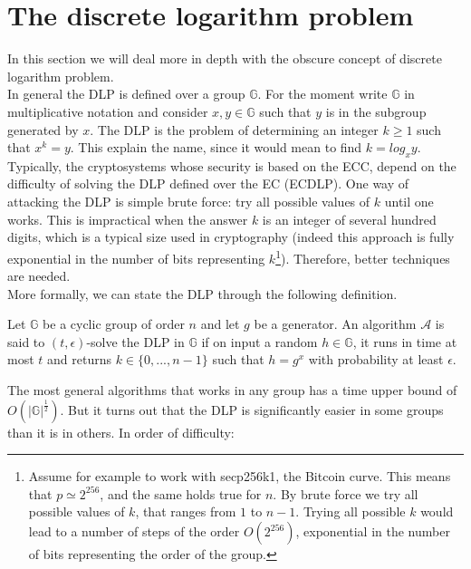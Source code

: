 \bigskip

\bigskip

\section{The discrete logarithm problem}
\label{dlp}
In this section we will deal more in depth with the obscure concept of discrete logarithm problem.
\\
In general the DLP is defined over a group $\mathbb{G}$. For the moment write $\mathbb{G}$ in multiplicative notation and consider $x, y \in \mathbb{G}$ such that $y$ is in the subgroup generated by $x$. The DLP is the problem of determining an integer $k \geq 1$ such that $x^k = y$. This explain the name, since it would mean to find $k = log_xy$.
\\
Typically, the cryptosystems whose security is based on the ECC, depend on the difficulty of solving the DLP defined over the EC (ECDLP). One way of attacking the DLP is simple brute force: try all possible values of $k$ until one works. This is impractical when the answer $k$ is an integer of several hundred digits, which is a typical size used in cryptography (indeed this approach is fully exponential in the number of bits representing $k$\footnote{Assume for example to work with secp256k1, the Bitcoin curve. This means that $p \simeq 2^{256}$, and the same holds true for $n$. By brute force we try all possible values of $k$, that ranges from $1$ to $n-1$. Trying all possible $k$ would lead to a number of steps of the order $O(2^{256})$, exponential in the number of bits representing the order of the group.}). Therefore, better techniques are needed.
\\
More formally, we can state the DLP through the following definition.
\begin{mydef}
	Let $\mathbb{G}$ be a cyclic group of order $n$ and let $g$ be a generator. An algorithm $\mathcal{A}$ is said to $(t, \epsilon)$-solve the DLP in $\mathbb{G}$ if on input a random $h \in \mathbb{G}$, it runs in time at most $t$ and returns $k \in \{0, ..., n - 1\}$ such that $h = g^x$ with probability at least $\epsilon$.
\end{mydef}
\noindent
The most general algorithms that works in any group has a time upper bound of $O(|\mathbb{G}|^{\frac{1}{2}})$. But it turns out that the DLP is significantly easier in some groups than it is in others. In order of difficulty:
